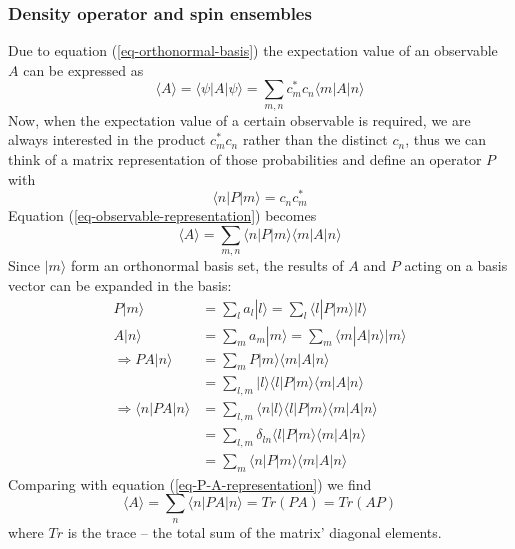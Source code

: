 \documentclass[11.5pt,a4paper]{article}
\begin{document}
\subsubsection{Density operator and spin ensembles}
Due to equation (\ref{eq-orthonormal-basis}) the expectation value of an observable $A$ can be expressed as 
\begin{equation}
 \langle A \rangle = \langle \psi | A | \psi \rangle = \sum_{m,n} c_m^* c_n \langle m | A | n \rangle
  \label{eq-observable-representation}
\end{equation}
Now, when the expectation value of a certain observable is required, we are always interested in the product $c_m^* c_n$ rather than the distinct $c_n$, thus we can think of a matrix representation of those probabilities and define an operator $P$ with
\begin{equation}
 \langle n | P | m \rangle = c_n c_m^*
\end{equation}
Equation (\ref{eq-observable-representation}) becomes
\begin{equation}
 \langle A \rangle = \sum_{m,n} \langle n | P | m \rangle \langle m | A | n \rangle
  \label{eq-P-A-representation}
\end{equation}
Since $|m\rangle$ form an orthonormal basis set, the results of $A$ and $P$ acting on a basis vector can be expanded in the basis:
\begin{align} 
 P|m\rangle & = \sum_l a_l |l\rangle = \sum_l \langle l | P | m \rangle | l \rangle\\
 A|n\rangle & = \sum_m a_m |m\rangle = \sum_m \langle m | A | n \rangle | m \rangle\\
 \Rightarrow P A |n\rangle & = \sum_m P|m\rangle \langle m | A | n \rangle \\
  & = \sum_{l,m} |l\rangle \langle l | P | m \rangle \langle m | A | n \rangle \\
  \Rightarrow \langle n | P A | n \rangle & = \sum_{l,m} \langle n|l\rangle \langle l | P | m \rangle \langle m | A | n \rangle \\
  & = \sum_{l,m} \delta_{ln} \langle l | P | m \rangle \langle m | A | n \rangle \\
  & = \sum_{m} \langle n | P | m \rangle \langle m | A | n \rangle
\end{align}
Comparing with equation (\ref{eq-P-A-representation}) we find
\begin{equation}
 \langle A \rangle = \sum_n \langle n | P A | n \rangle = Tr(P A) = Tr(A P)
 \label{eq-A-P-trace}
\end{equation}
where $Tr$ is the trace -- the total sum of the matrix' diagonal elements.
\end{document}
